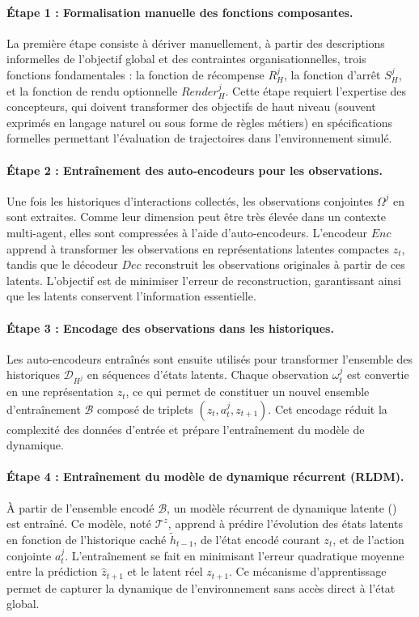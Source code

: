 \paragraph{Étape 1 : Formalisation manuelle des fonctions composantes.}
La première étape consiste à dériver manuellement, à partir des descriptions informelles de l'objectif global et des contraintes organisationnelles, trois fonctions fondamentales : la fonction de récompense $R^j_H$, la fonction d'arrêt $S^j_H$, et la fonction de rendu optionnelle $Render^j_H$.
Cette étape requiert l'expertise des concepteurs, qui doivent transformer des objectifs de haut niveau (souvent exprimés en langage naturel ou sous forme de règles métiers) en spécifications formelles permettant l'évaluation de trajectoires dans l'environnement simulé.

\paragraph{Étape 2 : Entraînement des auto-encodeurs pour les observations.}
Une fois les historiques d'interactions collectés, les observations conjointes $\Omega^j$ en sont extraites.
Comme leur dimension peut être très élevée dans un contexte multi-agent, elles sont compressées à l'aide d'auto-encodeurs.
L'encodeur $Enc$ apprend à transformer les observations en représentations latentes compactes $z_t$, tandis que le décodeur $Dec$ reconstruit les observations originales à partir de ces latents.
L'objectif est de minimiser l'erreur de reconstruction, garantissant ainsi que les latents conservent l'information essentielle.

\paragraph{Étape 3 : Encodage des observations dans les historiques.}
Les auto-encod\-eurs entraînés sont ensuite utilisés pour transformer l'ensemble des historiques $\mathcal{D}_{H^j}$ en séquences d'états latents.
Chaque observation $\omega_t^j$ est convertie en une représentation $z_t$, ce qui permet de constituer un nouvel ensemble d'entraînement $\mathcal{B}$ composé de triplets $(z_t, a_t^j, z_{t+1})$.
Cet encodage réduit la complexité des données d'entrée et prépare l'entraînement du modèle de dynamique.

\paragraph{Étape 4 : Entraînement du modèle de dynamique récurrent (RLDM).}
À partir de l'ensemble encodé $\mathcal{B}$, un modèle récurrent de dynamique latente () est entraîné.
Ce modèle, noté $\mathcal{T}^z$, apprend à prédire l'évolution des états latents en fonction de l'historique caché $\tilde{h}_{t-1}$, de l'état encodé courant $z_t$, et de l'action conjointe $a_t^j$.
L'entraînement se fait en minimisant l'erreur quadratique moyenne entre la prédiction $\hat{z}_{t+1}$ et le latent réel $z_{t+1}$.
Ce mécanisme d'apprentissage permet de capturer la dynamique de l'environnement sans accès direct à l'état global.


